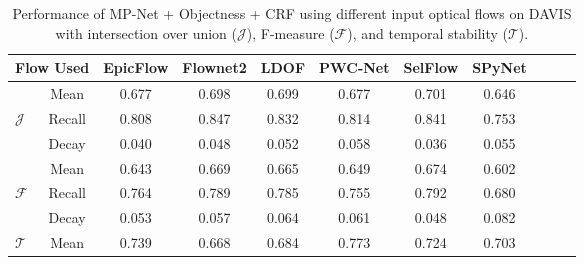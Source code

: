 \documentclass[10pt,letterpaper]{article}
\begin{document}
\begin{table*}
\footnotesize
\begin{center}
\begin{tabular}{l | c | c cccccccc}
\hline
\multicolumn{2}{c|}{Flow Used} & EpicFlow & Flownet2 & LDOF & PWC-Net & SelFlow & SPyNet \\ \hline
                & Mean       & 0.677                   & 0.698                   & 0.699               & 0.677                  & 0.701                  & 0.646                 \\
\textit{$\mathcal{J}$}      & Recall     & 0.808                   & 0.847                   & 0.832               & 0.814                  & 0.841                  & 0.753                 \\
                & Decay      & 0.040                   & 0.048                   & 0.052               & 0.058                  & 0.036                  & 0.055                 \\ \hline
                & Mean       & 0.643                   & 0.669                   & 0.665               & 0.649                  & 0.674                  & 0.602                 \\
\textit{$\mathcal{F}$}      & Recall     & 0.764                   & 0.789                   & 0.785               & 0.755                  & 0.792                  & 0.680                 \\
                & Decay      & 0.053                   & 0.057                   & 0.064               & 0.061                  & 0.048                  & 0.082                 \\ \hline
\textit{$\mathcal{T}$}      & Mean       & 0.739                   & 0.668                   & 0.684               & 0.773                  & 0.724                  & 0.703                 \\ \hline
\end{tabular}
\caption{Performance of MP-Net + Objectness + CRF using different input optical flows on DAVIS with intersection over
union ($\mathcal{J}$), F-measure ($\mathcal{F}$), and temporal stability
($\mathcal{T}$).}
\vspace{-0.7cm}
\end{center}
\end{table*}
\end{document}
